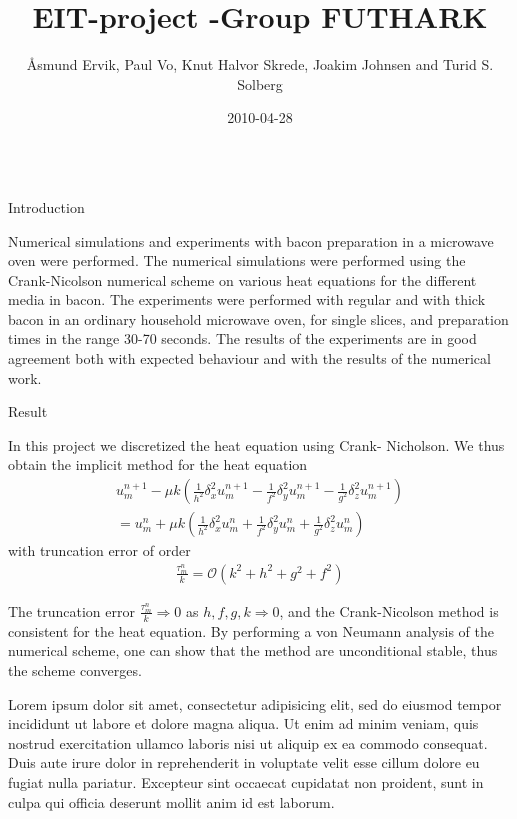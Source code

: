 \documentclass[final,hyperref={pdfpagelabels=false}]{beamer}
\title[NTNU-poster]{EIT-project -Group FUTHARK}
\author[Ervik et al.]{\AA smund Ervik, Paul Vo, Knut Halvor Skrede, Joakim Johnsen and Turid S. Solberg}
\institute[mia, NTNU]{MiA: Mathematics in Applications, Experts in Teamwork (Spring 2011), NTNU}
\date{2010-04-28}
\begin{document}
  \begin{frame}{}
  \begin{columns}[t]
  \begin{column}{.97\textwidth}

	\justifying

    \begin{multicols}{2}
	{\Large Introduction}

	Numerical simulations and experiments with bacon preparation
	in a microwave oven were performed. The numerical simulations were
	performed using the Crank-Nicolson numerical scheme on various heat
	equations for the different media in bacon. The experiments were
	performed with regular and with thick bacon in an ordinary household
	microwave oven, for single slices, and preparation times in the range
	30-70 seconds. The results of the experiments are in good agreement both
	with expected behaviour and with the results of the numerical work.


\vspace{1.0\baselineskip}
{\Large Result}

In this project we discretized the heat equation using Crank- Nicholson. 
We thus obtain the implicit method for the heat equation
\begin{eqnarray*}
u_m^{n+1}-\mu k(\frac{1}{h^2}\delta_x^2 u_m^{n+1}-\frac{1}{f^2}\delta_y^2 u_m^{n+1}-\frac{1}{g^2}\delta_z^2 u_m^{n+1}) \\
=u_m^n + \mu k(\frac{1}{h^2}\delta_x^2 u_m^n + \frac{1}{f^2}\delta_y^2 u_m^n +\frac{1}{g^2}\delta_z^2 u_m^n)
\label{crank}
\end{eqnarray*}
with truncation error of order
\begin{eqnarray*}
\frac{\tau_m^ n}{k} = \mathcal{O} (k^2 + h^2 + g^2 + f^2)
\label{truncerror}
\end{eqnarray*}

The truncation error $\frac{\tau_m^n}{k} \Rightarrow 0$ as $h,f,g,k \Rightarrow 0$, and the Crank-Nicolson method is consistent for the heat equation. By performing a von Neumann analysis of the numerical scheme, one can show that the method are unconditional stable, thus the scheme converges.

	Lorem ipsum dolor sit amet, consectetur adipisicing
	elit, sed do eiusmod tempor incididunt ut labore et
	dolore magna aliqua. Ut enim ad minim veniam, quis
	nostrud exercitation ullamco laboris nisi ut aliquip
	ex ea commodo consequat. Duis aute irure dolor in
	reprehenderit in voluptate velit esse cillum dolore
	eu fugiat nulla pariatur. Excepteur sint occaecat
	cupidatat non proident, sunt in culpa qui officia
	deserunt mollit anim id est laborum.


\end{multicols}
\end{column}
\end{columns}
\end{frame}
\end{document}

